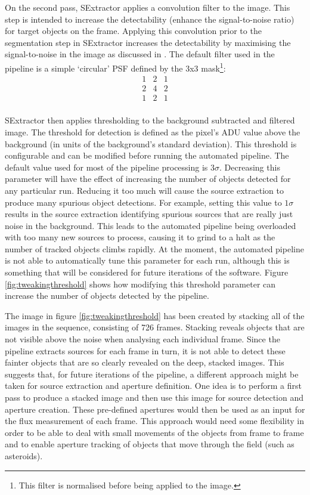 On the second pass, SExtractor applies a convolution filter to the image. This step is intended to increase the detectability (enhance the signal-to-noise ratio) for target objects on the frame. Applying this convolution prior to the segmentation step in SExtractor increases the detectability by maximising the signal-to-noise in the image as discussed in \citet{bertin}. The default filter used in the pipeline is a simple `circular' PSF defined by the 3x3 mask\footnote{This filter is normalised before being applied to the image.}:
\[
\begin{array}{ccc}
  1 & 2 & 1 \\
  2 & 4 & 2 \\
  1 & 2 & 1 \\
\end{array}  
\]

SExtractor then applies thresholding to the background subtracted and filtered image. The threshold for detection is defined as the pixel's ADU value above the background (in units of the background's standard deviation). This threshold is configurable and can be modified before running the automated pipeline. The default value used for most of the pipeline processing is $3\sigma$. Decreasing this parameter will have the effect of increasing the number of objects detected for any particular run. Reducing it too much will cause the source extraction to produce many spurious object detections. For example, setting this value to $1\sigma$ results in the source extraction identifying spurious sources that are really just noise in the background. This leads to the automated pipeline being overloaded with too many new sources to process, causing it to grind to a halt as the number of tracked objects climbs rapidly. At the moment, the automated pipeline is not able to automatically tune this parameter for each run, although this is something that will be considered for future iterations of the software. Figure \ref{fig:tweakingthreshold} shows how modifying this threshold parameter can increase the number of objects detected by the pipeline.

The image in figure \ref{fig:tweakingthreshold} has been created by stacking all of the images in the sequence, consisting of 726 frames. Stacking reveals objects that are not visible above the noise when analysing each individual frame. Since the pipeline extracts sources for each frame in turn, it is not able to detect these fainter objects that are so clearly revealed on the deep, stacked images. This suggests that, for future iterations of the pipeline, a different approach might be taken for source extraction and aperture definition. One idea is to perform a first pass to produce a stacked image and then use this image for source detection and aperture creation. These pre-defined apertures would then be used as an input for the flux measurement of each frame. This approach would need some flexibility in order to be able to deal with small movements of the objects from frame to frame and to enable aperture tracking of objects that move through the field (such as asteroids).


